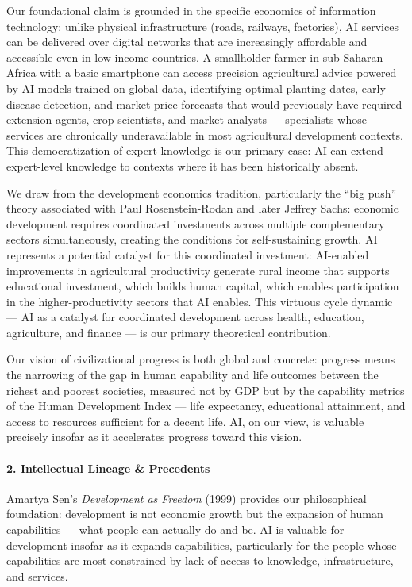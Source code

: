 Our foundational claim is grounded in the specific economics of
information technology: unlike physical infrastructure (roads, railways,
factories), AI services can be delivered over digital networks that are
increasingly affordable and accessible even in low-income countries. A
smallholder farmer in sub-Saharan Africa with a basic smartphone can
access precision agricultural advice powered by AI models trained on
global data, identifying optimal planting dates, early disease
detection, and market price forecasts that would previously have
required extension agents, crop scientists, and market analysts ---
specialists whose services are chronically underavailable in most
agricultural development contexts. This democratization of expert
knowledge is our primary case: AI can extend expert-level knowledge to
contexts where it has been historically absent.

We draw from the development economics tradition, particularly the ``big
push'' theory associated with Paul Rosenstein-Rodan and later Jeffrey
Sachs: economic development requires coordinated investments across
multiple complementary sectors simultaneously, creating the conditions
for self-sustaining growth. AI represents a potential catalyst for this
coordinated investment: AI-enabled improvements in agricultural
productivity generate rural income that supports educational investment,
which builds human capital, which enables participation in the
higher-productivity sectors that AI enables. This virtuous cycle dynamic
--- AI as a catalyst for coordinated development across health,
education, agriculture, and finance --- is our primary theoretical
contribution.

Our vision of civilizational progress is both global and concrete:
progress means the narrowing of the gap in human capability and life
outcomes between the richest and poorest societies, measured not by GDP
but by the capability metrics of the Human Development Index --- life
expectancy, educational attainment, and access to resources sufficient
for a decent life. AI, on our view, is valuable precisely insofar as it
accelerates progress toward this vision.

\paragraph{2. Intellectual Lineage \&
Precedents}\label{intellectual-lineage-precedents-46}

Amartya Sen's \emph{Development as Freedom} (1999) provides our
philosophical foundation: development is not economic growth but the
expansion of human capabilities --- what people can actually do and be.
AI is valuable for development insofar as it expands capabilities,
particularly for the people whose capabilities are most constrained by
lack of access to knowledge, infrastructure, and services.

